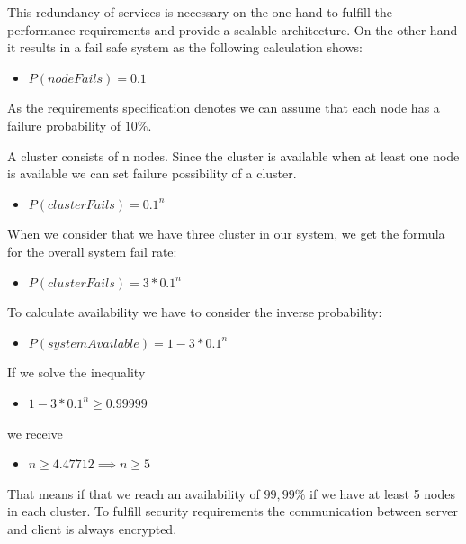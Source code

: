 \documentclass[11pt]{article}
\begin{document}
This redundancy of services is necessary on the one hand to fulfill the performance requirements and provide a scalable architecture. On the other hand it results in a fail safe system as the following calculation shows:

\begin{itemize}
\item $P(nodeFails) = 0.1$
\end{itemize}

As the requirements specification denotes we can assume that each node has a failure probability of $10\%$.

A cluster consists of n nodes. Since the cluster is available when at least one node is available we can set failure possibility of a cluster.

\begin{itemize}
\item $P(clusterFails) = 0.1^n$
\end{itemize}

When we consider that we have three cluster in our system, we get the formula for the overall system fail rate:

\begin{itemize}
\item $P(clusterFails) = 3 *0.1^n$
\end{itemize}

To calculate availability we have to consider the inverse probability:

\begin{itemize}
\item $P(systemAvailable) = 1 - 3 *0.1^n$
\end{itemize}

If we solve the inequality

\begin{itemize}
\item $1 - 3 *0.1^n \ge 0.99999$
\end{itemize}

we receive

\begin{itemize}
\item $n \ge 4.47712 \implies n \ge 5$
\end{itemize}

That means if that we reach an availability of $99,99\%$ if we have at least 5 nodes in each cluster. To fulfill security requirements the communication between server and client is always encrypted.

\newpage
\end{document}

